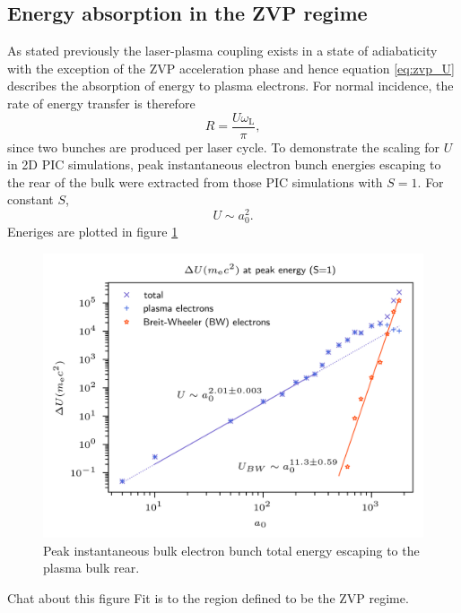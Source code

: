 \subsection{Energy absorption in the ZVP regime}\label{sec:zvp-energyabsorption}
As stated previously the laser-plasma coupling exists in a state of adiabaticity with the exception of the ZVP acceleration phase and hence equation \ref{eq:zvp_U} describes the absorption of energy to plasma electrons. For normal incidence, the rate of energy transfer is therefore
\begin{equation}\label{eq:zvp-rate}
	R = \frac{U\omega_\mathrm{L}}{\pi},
\end{equation}
since two bunches are produced per laser cycle. To demonstrate the scaling for $U$ in 2D PIC simulations, peak instantaneous electron bunch energies escaping to the rear of the bulk were extracted from those PIC simulations with $S=1$. For constant $S$, 
\begin{equation}
	U \sim a^2_0.
\end{equation}
Eneriges are plotted in figure \ref{fig:zvppeakgamma}
\begin{figure}
	\centering
	\includegraphics[width=0.7\linewidth]{figures/zvp/zvp_peak_gamma}
	\caption[Peak instantaneous bulk electron bunch total energy escaping to the plasma bulk rear.]{Peak instantaneous bulk electron bunch total energy escaping to the plasma bulk rear.}
	\label{fig:zvppeakgamma}
\end{figure}


Chat about this figure
Fit is to the region defined to be the ZVP regime.




